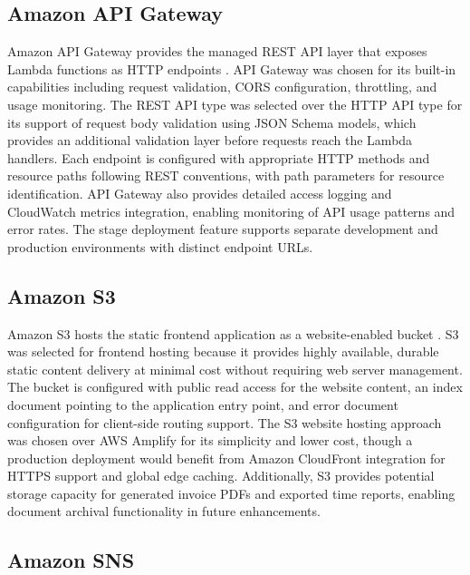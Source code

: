 \documentclass[conference]{IEEEtran}
\begin{document}
\subsection{Amazon API Gateway}

Amazon API Gateway provides the managed REST API layer that exposes Lambda functions as HTTP endpoints \cite{awsapigateway}. API Gateway was chosen for its built-in capabilities including request validation, CORS configuration, throttling, and usage monitoring. The REST API type was selected over the HTTP API type for its support of request body validation using JSON Schema models, which provides an additional validation layer before requests reach the Lambda handlers. Each endpoint is configured with appropriate HTTP methods and resource paths following REST conventions, with path parameters for resource identification. API Gateway also provides detailed access logging and CloudWatch metrics integration, enabling monitoring of API usage patterns and error rates. The stage deployment feature supports separate development and production environments with distinct endpoint URLs.

\subsection{Amazon S3}

Amazon S3 hosts the static frontend application as a website-enabled bucket \cite{awss3}. S3 was selected for frontend hosting because it provides highly available, durable static content delivery at minimal cost without requiring web server management. The bucket is configured with public read access for the website content, an index document pointing to the application entry point, and error document configuration for client-side routing support. The S3 website hosting approach was chosen over AWS Amplify for its simplicity and lower cost, though a production deployment would benefit from Amazon CloudFront integration for HTTPS support and global edge caching. Additionally, S3 provides potential storage capacity for generated invoice PDFs and exported time reports, enabling document archival functionality in future enhancements.

\subsection{Amazon SNS}
\end{document}
